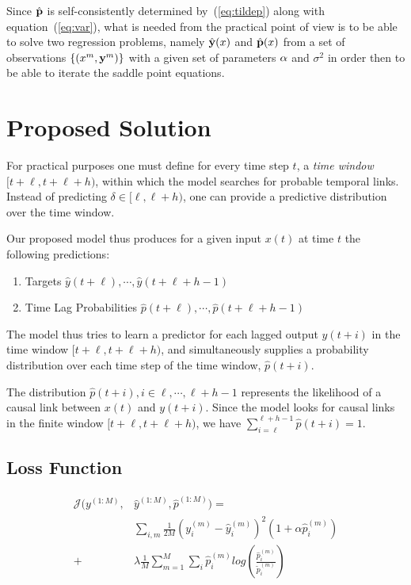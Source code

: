 \documentclass[envcountsect,runningheads]{llncs}
\theoremstyle{etoile}
\begin{document}
Since $\hat {\bf p}$ is self-consistently determined by~(\ref{eq:tildep}) along with equation~(\ref{eq:var}), what is needed from the practical point of view is to be able
to solve two  regression problems, namely $\hat {\bf y}(x)$ and $\hat {\bf p}(x)$ from a set of observations $\{(x^{m},{\bf y}^{m})\}$ with a given set of parameters ${\bf \alpha}$
and $\sigma^2$ in order then to be able to iterate the saddle point equations.


\section{Proposed Solution}\label{sec:model}

For practical purposes one must define for every time step $t$, a \emph{time window} 
$[t+\ell, t+\ell+h)$, within which the model searches for probable temporal links. 
Instead of predicting $\delta \in [\ell, \ell+h)$, one can provide a predictive distribution 
over the time window.

Our proposed model thus produces for a given input $x(t)$ at time $t$ the following predictions:

\begin{enumerate}
\item Targets $\hat{y}(t+\ell), \cdots, \hat{y}(t+\ell+h-1)$
\item Time Lag Probabilities $\hat{p}(t+\ell), \cdots, \hat{p}(t+\ell+h-1)$
\end{enumerate}

The model thus tries to learn a predictor for each lagged output $y(t+i)$ in the time window 
$[t+\ell, t+\ell+h)$, and simultaneously supplies a probability distribution over each time step 
of the time window, $\hat{p}(t+i)$.

The distribution $\hat{p}(t+i), i \in {\ell, \cdots, \ell+h-1}$ represents the 
likelihood of a causal link between $x(t)$ and $y(t+i)$. Since the model looks
for causal links in the finite window $[t+\ell, t+\ell+h)$, we have 
$\sum^{\ell+h-1}_{i = \ell}{\hat{p}(t + i)} = 1$.


\subsection{Loss Function}

\begin{equation}\label{eq:loss}
\begin{aligned}
\mathcal{J}(y^{(1:M)}, &\hat{y}^{(1:M)}, \hat{p}^{(1:M)}) =\\ 
& \sum_{i,m}{\frac{1}{2M} (y^{(m)}_{i} - \hat{y}^{(m)}_{i})^2 (1 + \alpha \hat{p}^{(m)}_i)} \\ 
+ &\lambda \frac{1}{M} \sum_{m = 1}^{M}{\sum_{i}{\hat{p}^{(m)}_{i}log \left (\frac{\hat{p}^{(m)}_i}{\tilde{p}^{(m)}_i} \right)}}
\end{aligned}
\end{equation}
      
\end{document}
